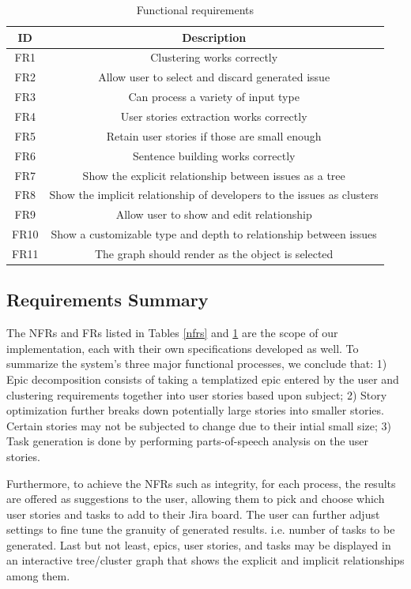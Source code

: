 \begin{table}
\centering
\caption{Functional requirements}
\label{frt}
\begin{tabular}{ |c|c| } 
\hline
\multicolumn{1}{|c|}{\textbf{ID}} & \multicolumn{1}{c|}{\textbf{Description}} \\
\hline
FR1 & Clustering works correctly \\
\hline
FR2 & Allow user to select and discard generated issue \\
\hline
FR3 & Can process a variety of input type \\
\hline
FR4 & User stories extraction works correctly \\
\hline
FR5 & Retain user stories if those are small enough \\
\hline
FR6 & Sentence building works correctly \\
\hline
FR7 & Show the explicit relationship between issues as a tree \\
\hline
FR8 & Show the implicit relationship of developers to the issues as clusters \\
\hline
FR9 & Allow user to show and edit relationship \\
\hline
FR10 & Show a customizable type and depth to relationship between issues \\
\hline
FR11 & The graph should render as the object is selected \\
\hline
\end{tabular}
\end{table}

\subsection{Requirements Summary}
The NFRs and FRs listed in Tables \ref{nfrs} and \ref{frt} are the scope of our implementation, each with their own specifications developed as well. To summarize the system's three major functional processes, we conclude that: 1) Epic decomposition consists of taking a templatized epic entered by the user and clustering requirements together into user stories based upon subject; 2) Story optimization further breaks down potentially large stories into smaller stories. Certain stories may not be subjected to change due to their intial small size; 3) Task generation is done by performing parts-of-speech analysis on the user stories. 

Furthermore, to achieve the NFRs such as integrity, for each process, the results are offered as suggestions to the user, allowing them to pick and choose which user stories and tasks to add to their Jira board. The user can further adjust settings to fine tune the granuity of generated results. i.e. number of tasks to be generated. Last but not least, epics, user stories, and tasks may be displayed in an interactive tree/cluster graph that shows the explicit and implicit relationships among them.

